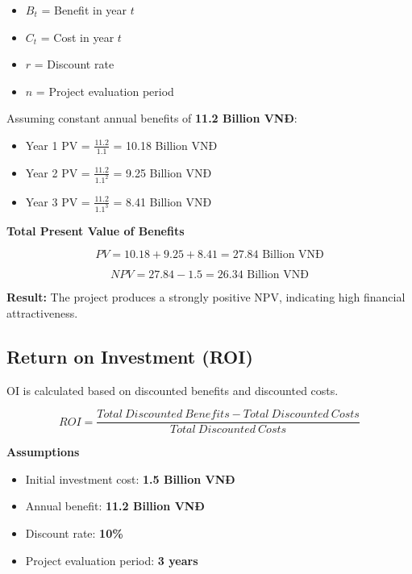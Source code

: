 \begin{itemize}
    \item $B_t$ = Benefit in year $t$
    \item $C_t$ = Cost in year $t$
    \item $r$ = Discount rate
    \item $n$ = Project evaluation period
\end{itemize}

Assuming constant annual benefits of \textbf{11.2 Billion VNĐ}:

\begin{itemize}
    \item Year 1 PV = $\frac{11.2}{1.1}$ = 10.18 Billion VNĐ
    \item Year 2 PV = $\frac{11.2}{1.1^2}$ = 9.25 Billion VNĐ
    \item Year 3 PV = $\frac{11.2}{1.1^3}$ = 8.41 Billion VNĐ
\end{itemize}

\textbf{Total Present Value of Benefits}

\[
PV = 10.18 + 9.25 + 8.41 = 27.84 \text{ Billion VNĐ}
\]

\[
NPV = 27.84 - 1.5 = 26.34 \text{ Billion VNĐ}
\]

\textbf{Result:} The project produces a strongly positive NPV, indicating high financial attractiveness.

\subsection{Return on Investment (ROI)}

OI is calculated based on discounted benefits and discounted costs.

\begin{center}
{\Large
\[
ROI = \frac{Total\ Discounted\ Benefits - Total\ Discounted\ Costs}{Total\ Discounted\ Costs}
\]
}
\end{center}

\textbf{Assumptions}

\begin{itemize}
\item Initial investment cost: \textbf{1.5 Billion VNĐ}
\item Annual benefit: \textbf{11.2 Billion VNĐ}
\item Discount rate: \textbf{10\%}
\item Project evaluation period: \textbf{3 years}
\end{itemize}

